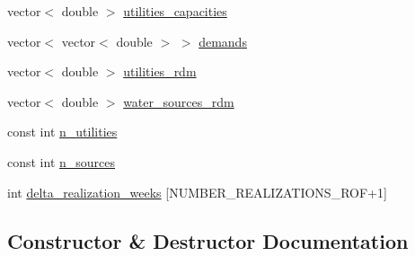 \begin{DoxyCompactItemize}
\item 
vector$<$ double $>$ \mbox{\hyperlink{classContinuityModel_a781786effdf14fefcb2201eb33d9e0c7_a781786effdf14fefcb2201eb33d9e0c7}{utilities\+\_\+capacities}}
\item 
vector$<$ vector$<$ double $>$ $>$ \mbox{\hyperlink{classContinuityModel_a1994ed4d99e0583eac5c82a4b26d9728_a1994ed4d99e0583eac5c82a4b26d9728}{demands}}
\item 
vector$<$ double $>$ \mbox{\hyperlink{classContinuityModel_aa4a00b76da6295d2faa11e3dcaea1896_aa4a00b76da6295d2faa11e3dcaea1896}{utilities\+\_\+rdm}}
\item 
vector$<$ double $>$ \mbox{\hyperlink{classContinuityModel_ab7b8fa93a6f56b328e425e1ead6cfefa_ab7b8fa93a6f56b328e425e1ead6cfefa}{water\+\_\+sources\+\_\+rdm}}
\item 
const int \mbox{\hyperlink{classContinuityModel_a6df6198ebc99a099df08f4b8ce6b52b9_a6df6198ebc99a099df08f4b8ce6b52b9}{n\+\_\+utilities}}
\item 
const int \mbox{\hyperlink{classContinuityModel_a3c25a0d17579eb0fdad0b18319441460_a3c25a0d17579eb0fdad0b18319441460}{n\+\_\+sources}}
\item 
int \mbox{\hyperlink{classContinuityModel_aee4088e422a0d3723dc7895c96c9ebe3_aee4088e422a0d3723dc7895c96c9ebe3}{delta\+\_\+realization\+\_\+weeks}} \mbox{[}N\+U\+M\+B\+E\+R\+\_\+\+R\+E\+A\+L\+I\+Z\+A\+T\+I\+O\+N\+S\+\_\+\+R\+OF+1\mbox{]}
\end{DoxyCompactItemize}


\subsection{Constructor \& Destructor Documentation}
\mbox{\label{classContinuityModel_acadf595deb924bc08c9b702adf223365_acadf595deb924bc08c9b702adf223365}} 
